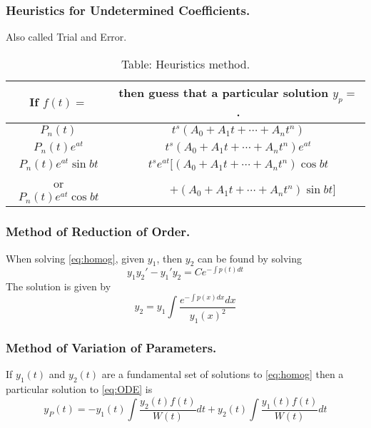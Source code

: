 \documentclass[../../main.tex]{subfiles}
\begin{document}
\subsubsection{Heuristics for Undetermined Coefficients.} Also called Trial and Error.
\begin{table}[h]
  \centering
  \caption*{Table: Heuristics method.}
  \begin{tabular}{cc } 
      \toprule
      If $f(t)=$ & then guess that a particular solution $y_p=$. \\
      \midrule
       $P_n(t)$ & $t^s (A_0 + A_1 t + \cdots + A_n t^n)$ \\
      $P_n(t)e^{at}$ & $t^s (A_0 + A_1 t + \cdots + A_n t^n)e^{at}$ \\
      $P_n(t)e^{at}\sin bt$ & $t^s e^{at} [(A_0 + A_1 t + \cdots + A_n t^n)\cos bt$ \\
      or $P_n(t)e^{at}\cos bt$ & \ \ \ \ \ $ + (A_0 + A_1 t + \cdots + A_n t^n)\sin bt]$ \\
      \bottomrule
  \end{tabular}
\end{table}


\subsubsection{Method of Reduction of Order.} When solving \eqref{eq:homog}, given $y_1$, then $y_2$ can be found by solving
\begin{equation*}
y_1 y_2' - y_1'y_2 = Ce^{-\int p(t) dt}
\end{equation*}
The solution is given by 
\begin{equation}
y_2 = y_1\int \dfrac{e^{-\int p(x) dx} dx}{y_1(x)^2}\label{eq:ROE}
\end{equation}

\subsubsection{Method of Variation of Parameters.} If $y_1(t)$ and $y_2(t)$ are a fundamental set of solutions to \eqref{eq:homog} then a particular solution to \eqref{eq:ODE} is 
\begin{equation}
y_P (t) = -y_1(t) \int \dfrac{y_2(t) f(t)}{W(t)}dt + y_2(t) \int \dfrac{y_1(t) f(t)}{W(t)}dt 
\end{equation}
\end{document}

